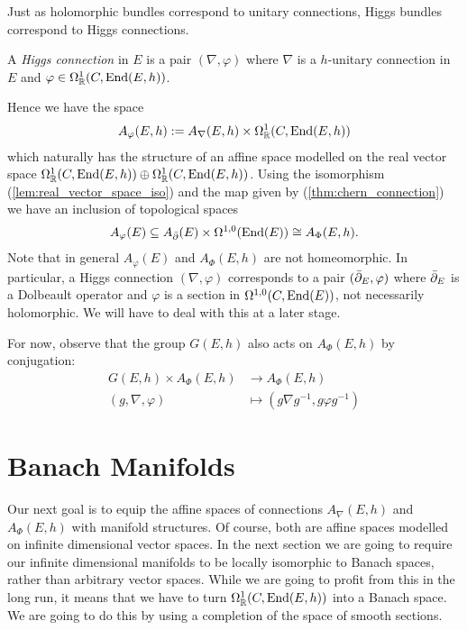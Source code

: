 \documentclass[12pt]{ociamthesis}  %
\begin{document}
Just as holomorphic bundles correspond to unitary connections, Higgs bundles
correspond to Higgs connections.

\begin{definition}
  A \emph{Higgs connection} in $E$ is a pair $(\nabla,\varphi)$
  where $\nabla$ is a $h$-unitary connection in $E$ and
  $\varphi\in\Omega^1_{\mathbb{R}}(C,\operatorname{End}(E,h))$.
\end{definition}

Hence we have the space
\begin{align}\label{eq:Higgs_connections_space}
  A_{\varphi}(E,h) := A_\nabla(E,h) \times \Omega^1_{\mathbb{R}}(C,\operatorname{End}(E,h))
\end{align}
which naturally has the structure of an affine space modelled on
the real vector space
$\Omega^1_{\mathbb{R}}(C,\operatorname{End}(E,h))\oplus\Omega_{\mathbb{R}}^1(C,\operatorname{End}(E,h))$. Using the isomorphism (\ref{lem:real_vector_space_iso})
and the map given by (\ref{thm:chern_connection}) we have an inclusion
of topological spaces
\begin{align}\label{eq:higgs_chern_correspondence}
  A_\varphi(E) \subseteq A_{\bar{\partial}} (E) \times \Omega^{1,0}(\operatorname{End}(E)) \cong A_\Phi(E,h).
\end{align}
Note that in general $A_\varphi(E)$ and $A_\Phi(E,h)$ are not homeomorphic. In
particular, a Higgs connection $(\nabla,\varphi)$ corresponds to
a pair $({\bar{\partial}}_E,\varphi)$ where ${\bar{\partial}}_E$ is a Dolbeault operator and
$\varphi$ is a section in $\Omega^{1,0}(C,\operatorname{End}(E))$, not necessarily
holomorphic. We will have to deal with this at a later stage.

For now, observe that the group $G(E,h)$ also acts on $A_\Phi(E,h)$
by conjugation:
\begin{align*}
  G(E,h) \times A_\Phi(E,h) & \to A_\Phi(E,h)                        \\
  (g,\nabla,\varphi)            & \mapsto (g\nabla{g}^{-1},g\varphi{g}^{-1})
\end{align*}

\section{Banach Manifolds}

Our next goal is to equip the affine spaces of connections $A_\nabla(E,h)$
and $A_\Phi(E,h)$ with manifold structures. Of course, both are affine
spaces modelled on infinite dimensional vector spaces. In the next
section we are going to require our infinite dimensional manifolds to
be locally isomorphic to Banach spaces, rather than arbitrary
vector spaces. While we are going to profit from this in the long run,
it means that we have to turn $\Omega^1_{\mathbb{R}}(C,\operatorname{End}(E,h))$
into a Banach space. We are going to do this by using a completion of
the space of smooth sections.
\end{document}
